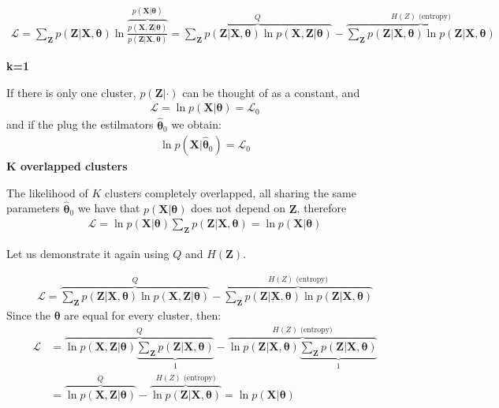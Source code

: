 \documentclass[10pt,a4paper]{article}
\begin{document}
\begin{align*}
\mathcal{L}
= 
\sum_{\mathbf{Z}} p(\mathbf{Z} | \mathbf{X}, \boldsymbol{\theta})
\ln 
\overbrace{
\frac{ p(\mathbf{X}, \mathbf{Z} | \boldsymbol{\theta})}{p(\mathbf{Z} | \mathbf{X}, \boldsymbol{\theta})}
}^{p(\mathbf{X} | \boldsymbol{\theta})} 
=
\overbrace{
\sum_{\mathbf{Z}}
p(\mathbf{Z} | \mathbf{X}, \boldsymbol{\theta}) \ln p(\mathbf{X}, \mathbf{Z} | \boldsymbol{\theta})
}^{Q}
- 
\overbrace{
\sum_{\mathbf{Z}} p(\mathbf{Z} | \mathbf{X}, \boldsymbol{\theta})\ln p(\mathbf{Z} | \mathbf{X}, \boldsymbol{\theta})
}^{H(Z) \text{ (entropy)}}
\end{align*}

\textbf{k=1}

If there is only one cluster, $p(\mathbf{Z} | \cdot)$ can be thought of as a constant, and 
\begin{align*}
\mathcal{L} = \ln p(\mathbf{X}|  \boldsymbol{\theta}) = \mathcal{L}_0
\end{align*}
and if the plug the estilmators $\hat{\boldsymbol{\theta}}_0$ we obtain:
\begin{align*}
\ln p(\mathbf{X}|  \hat{\boldsymbol{\theta}}_0) = \mathcal{L}_0
\end{align*}
\textbf{K overlapped clusters}

The likelihood of $K$ clusters completely overlapped, all sharing the same parameters $\hat{\boldsymbol{\theta}}_0$ we have that $p(\mathbf{X} | \boldsymbol{\theta})$ does not depend on $\mathbf{Z}$, therefore
\begin{align*}
\mathcal{L}
=
\ln 
p(\mathbf{X} | \boldsymbol{\theta})  
\sum_{\mathbf{Z}} p(\mathbf{Z} | \mathbf{X}, \boldsymbol{\theta})
= 
\ln 
p(\mathbf{X} | \boldsymbol{\theta}) 
\end{align*}

Let us demonstrate it again using $Q$ and $H(\mathbf{Z})$.

\begin{align*}
\mathcal{L}
= 
\overbrace{
\sum_{\mathbf{Z}}
p(\mathbf{Z} | \mathbf{X}, \boldsymbol{\theta}) 
\ln p(\mathbf{X}, \mathbf{Z} | \boldsymbol{\theta})
}^{Q}
- 
\overbrace{
\sum_{\mathbf{Z}} p(\mathbf{Z} | \mathbf{X}, \boldsymbol{\theta})\ln p(\mathbf{Z} | \mathbf{X}, \boldsymbol{\theta})
}^{H(Z) \text{ (entropy)}}
\end{align*}
Since the $\boldsymbol{\theta}$ are equal for every cluster, then:
\begin{align*}
\mathcal{L}
&= 
\overbrace{
\ln p(\mathbf{X}, \mathbf{Z} | \boldsymbol{\theta})
\underbrace{
\sum_{\mathbf{Z}}
p(\mathbf{Z} | \mathbf{X}, \boldsymbol{\theta}) 
}_1
}^{Q}
- 
\overbrace{
\ln p(\mathbf{Z} | \mathbf{X}, \boldsymbol{\theta})
\underbrace{
\sum_{\mathbf{Z}} p(\mathbf{Z} | \mathbf{X}, \boldsymbol{\theta})
}_1
}^{H(Z) \text{ (entropy)}}
\\&=
\overbrace{
\ln p(\mathbf{X}, \mathbf{Z} | \boldsymbol{\theta})
}^{Q}
- 
\overbrace{
\ln p(\mathbf{Z} | \mathbf{X}, \boldsymbol{\theta})
}^{H(Z) \text{ (entropy)}} = \ln p(\mathbf{X}| \boldsymbol{\theta})
\end{align*}

\end{document}
